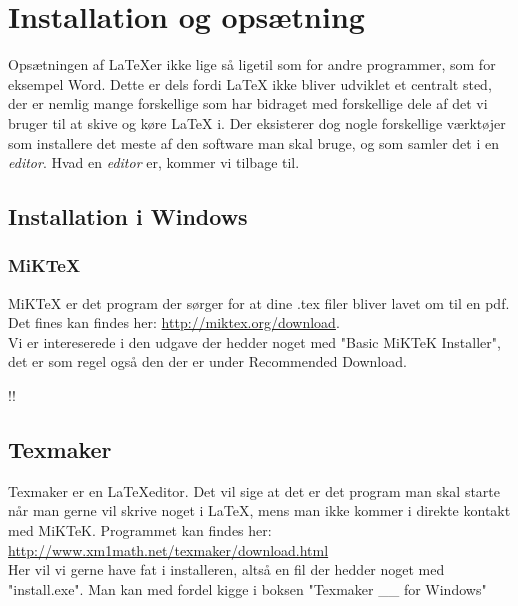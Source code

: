 \section{Installation og opsætning}
Opsætningen af \LaTeX er ikke lige så ligetil som for andre programmer, som for eksempel Word.
Dette er dels fordi \LaTeX{} ikke bliver udviklet et centralt sted,
der er nemlig mange forskellige som har bidraget med forskellige dele af det vi bruger til at skive og køre \LaTeX{} i.
Der eksisterer dog nogle forskellige værktøjer som installere det meste af den software man skal bruge,
og som samler det i en \textit{editor}.
Hvad en \textit{editor} er, kommer vi tilbage til.

\subsection{Installation i Windows}
\subsubsection{MiKTeX}
MiKTeX er det program der sørger for at dine .tex filer bliver lavet om til en pdf.\\
Det fines kan findes her: \url{http://miktex.org/download}.\\
Vi er intereserede i den udgave der hedder noget med "Basic MiKTeK Installer",
det er som regel også den der er under Recommended Download.

!!

\subsection{Texmaker}
Texmaker er en \LaTeX editor.
Det vil sige at det er det program man skal starte når man gerne vil skrive noget i \LaTeX,
mens man ikke kommer i direkte kontakt med MiKTeK.
Programmet kan findes her: \url{http://www.xm1math.net/texmaker/download.html}\\
Her vil vi gerne have fat i installeren, altså en fil der hedder noget med "install.exe".
Man kan med fordel kigge i boksen "Texmaker \_\_ for Windows"

\pagebreak
